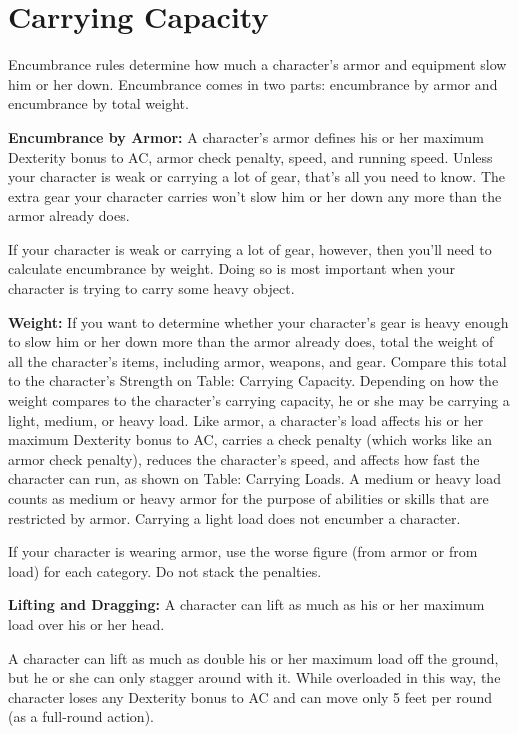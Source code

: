 \section{Carrying Capacity}

Encumbrance rules determine how much a character's armor and equipment slow him 
or her down. Encumbrance comes in two parts: encumbrance by armor and encumbrance 
by total weight.

\textbf{Encumbrance by Armor:} A character's armor defines his or her maximum Dexterity 
bonus to AC, armor check penalty, speed, and running speed. Unless your character 
is weak or carrying a lot of gear, that's all you need to know. The extra gear 
your character carries won't slow him or her down any more than the armor already 
does.

If your character is weak or carrying a lot of gear, however, then you'll need 
to calculate encumbrance by weight. Doing so is most important when your character 
is trying to carry some heavy object.

\textbf{Weight:} If you want to determine whether your character's gear is heavy 
enough to slow him or her down more than the armor already does, total the weight 
of all the character's items, including armor, weapons, and gear. Compare this 
total to the character's Strength on Table: Carrying Capacity. Depending on how 
the weight compares to the character's carrying capacity, he or she may be carrying 
a light, medium, or heavy load. Like armor, a character's load affects his or her 
maximum Dexterity bonus to AC, carries a check penalty (which works like an armor 
check penalty), reduces the character's speed, and affects how fast the character 
can run, as shown on Table: Carrying Loads. A medium or heavy load counts as medium 
or heavy armor for the purpose of abilities or skills that are restricted by armor. 
Carrying a light load does not encumber a character.

If your character is wearing armor, use the worse figure (from armor or from load) 
for each category. Do not stack the penalties.

\textbf{Lifting and Dragging:} A character can lift as much as his or her maximum 
load over his or her head.

A character can lift as much as double his or her maximum load off the ground, 
but he or she can only stagger around with it. While overloaded in this way, the 
character loses any Dexterity bonus to AC and can move only 5 feet per round (as 
a full-round action).


